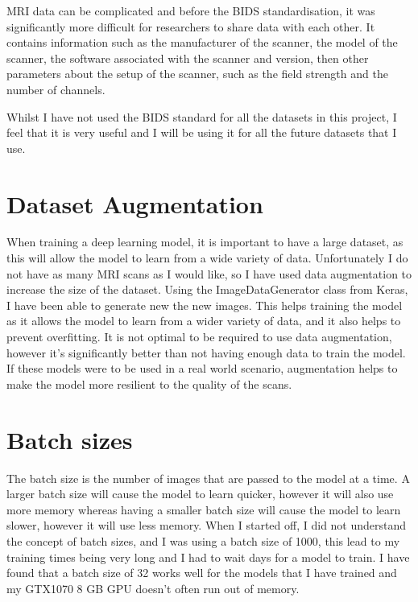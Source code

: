 \documentclass[]{final_report}
\begin{document}
MRI data can be complicated and before the BIDS standardisation, it was significantly more difficult for researchers to share data with each other. It contains information such as the manufacturer of the scanner, the model of the scanner, the software associated with the scanner and version, then other parameters about the setup of the scanner, such as the field strength and the number of channels.\cite{BIDS_metadata}

Whilst I have not used the BIDS standard for all the datasets in this project, I feel that it is very useful and I will be using it for all the future datasets that I use.

\section{Dataset Augmentation}

When training a deep learning model, it is important to have a large dataset, as this will allow the model to learn from a wide variety of data.
Unfortunately I do not have as many MRI scans as I would like, so I have used data augmentation to increase the size of the dataset.
Using the ImageDataGenerator class from Keras\cite{Keras}, I have been able to generate new the new images.
This helps training the model as it allows the model to learn from a wider variety of data, and it also helps to prevent overfitting.
It is not optimal to be required to use data augmentation, however it's significantly better than not having enough data to train the model.
If these models were to be used in a real world scenario, augmentation helps to make the model more resilient to the quality of the scans.

\section{Batch sizes}
The batch size is the number of images that are passed to the model at a time.
A larger batch size will cause the model to learn quicker, however it will also use more memory whereas
having a smaller batch size will cause the model to learn slower, however it will use less memory.
When I started off, I did not understand the concept of batch sizes, and I was using a batch size of 1000, this lead to my training times
being very long and I had to wait days for a model to train.
I have found that a batch size of 32 works well for the models that I have trained and my GTX1070 8 GB GPU\cite{GTX1070} doesn't often run out of memory.
\end{document}

